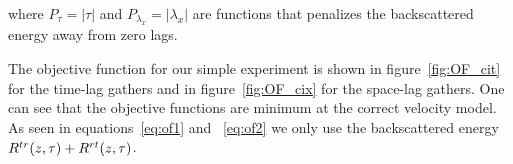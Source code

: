 where $P_{\tau}=|\tau|$ and $P_{\lambda_x}=|\lambda_x|$ are functions that penalizes the backscattered energy away 
from zero lags.

The objective function for our simple experiment is shown in figure~\ref{fig:OF_cit} for the time-lag gathers
 and in figure~\ref{fig:OF_cix} for the space-lag gathers. One can see that the objective functions are minimum at the correct velocity model.
As seen in equations~\ref{eq:of1} and ~\ref{eq:of2} we only use the backscattered energy $R^{tr}(z,\tau)+R^{rt}(z,\tau)$. 


